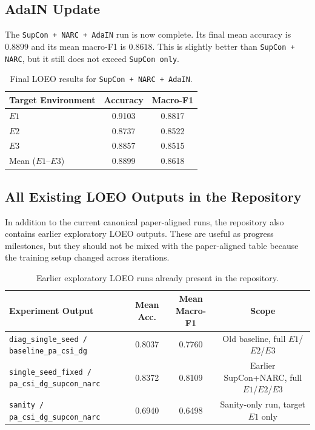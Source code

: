 \documentclass[11pt]{article}
\begin{document}
\subsection{AdaIN Update}
The \texttt{SupCon + NARC + AdaIN} run is now complete. Its final mean accuracy is $0.8899$ and its mean macro-F1 is $0.8618$. This is slightly better than \texttt{SupCon + NARC}, but it still does not exceed \texttt{SupCon only}.

\begin{table}[H]
\centering
\caption{Final LOEO results for \texttt{SupCon + NARC + AdaIN}.}
\label{tab:adainpartial}
\begin{tabular}{lcc}
\toprule
Target Environment & Accuracy & Macro-F1 \\
\midrule
$E1$ & 0.9103 & 0.8817 \\
$E2$ & 0.8737 & 0.8522 \\
$E3$ & 0.8857 & 0.8515 \\
Mean ($E1$--$E3$) & 0.8899 & 0.8618 \\
\bottomrule
\end{tabular}
\end{table}

\subsection{All Existing LOEO Outputs in the Repository}
In addition to the current canonical paper-aligned runs, the repository also contains earlier exploratory LOEO outputs. These are useful as progress milestones, but they should not be mixed with the paper-aligned table because the training setup changed across iterations.

\begin{table}[H]
\centering
\caption{Earlier exploratory LOEO runs already present in the repository.}
\label{tab:historical}
\begin{tabular}{p{2.9in}ccc}
\toprule
Experiment Output & Mean Acc. & Mean Macro-F1 & Scope \\
\midrule
\texttt{diag\_single\_seed / baseline\_pa\_csi\_dg} & 0.8037 & 0.7760 & Old baseline, full $E1$/$E2$/$E3$ \\
\texttt{single\_seed\_fixed / pa\_csi\_dg\_supcon\_narc} & 0.8372 & 0.8109 & Earlier SupCon+NARC, full $E1$/$E2$/$E3$ \\
\texttt{sanity / pa\_csi\_dg\_supcon\_narc} & 0.6940 & 0.6498 & Sanity-only run, target $E1$ only \\
\bottomrule
\end{tabular}
\end{table}
\end{document}

